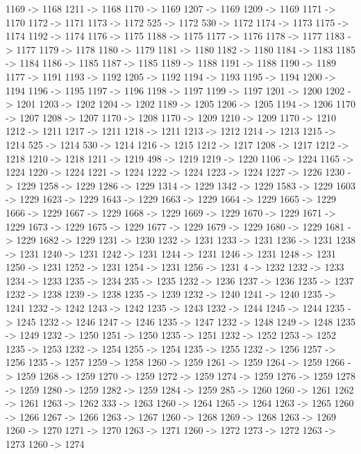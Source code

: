 {	1169 -> 1168
	1211 -> 1168
	1170 -> 1169
	1207 -> 1169
	1209 -> 1169
	1171 -> 1170
	1172 -> 1171
	1173 -> 1172
	525 -> 1172
	530 -> 1172
	1174 -> 1173
	1175 -> 1174
	1192 -> 1174
	1176 -> 1175
	1188 -> 1175
	1177 -> 1176
	1178 -> 1177
	1183 -> 1177
	1179 -> 1178
	1180 -> 1179
	1181 -> 1180
	1182 -> 1180
	1184 -> 1183
	1185 -> 1184
	1186 -> 1185
	1187 -> 1185
	1189 -> 1188
	1191 -> 1188
	1190 -> 1189
	1177 -> 1191
	1193 -> 1192
	1205 -> 1192
	1194 -> 1193
	1195 -> 1194
	1200 -> 1194
	1196 -> 1195
	1197 -> 1196
	1198 -> 1197
	1199 -> 1197
	1201 -> 1200
	1202 -> 1201
	1203 -> 1202
	1204 -> 1202
	1189 -> 1205
	1206 -> 1205
	1194 -> 1206
	1170 -> 1207
	1208 -> 1207
	1170 -> 1208
	1170 -> 1209
	1210 -> 1209
	1170 -> 1210
	1212 -> 1211
	1217 -> 1211
	1218 -> 1211
	1213 -> 1212
	1214 -> 1213
	1215 -> 1214
	525 -> 1214
	530 -> 1214
	1216 -> 1215
	1212 -> 1217
	1208 -> 1217
	1212 -> 1218
	1210 -> 1218
	1211 -> 1219
	498 -> 1219
	1219 -> 1220
	1106 -> 1224
	1165 -> 1224
	1220 -> 1224
	1221 -> 1224
	1222 -> 1224
	1223 -> 1224
	1227 -> 1226
	1230 -> 1229
	1258 -> 1229
	1286 -> 1229
	1314 -> 1229
	1342 -> 1229
	1583 -> 1229
	1603 -> 1229
	1623 -> 1229
	1643 -> 1229
	1663 -> 1229
	1664 -> 1229
	1665 -> 1229
	1666 -> 1229
	1667 -> 1229
	1668 -> 1229
	1669 -> 1229
	1670 -> 1229
	1671 -> 1229
	1673 -> 1229
	1675 -> 1229
	1677 -> 1229
	1679 -> 1229
	1680 -> 1229
	1681 -> 1229
	1682 -> 1229
	1231 -> 1230
	1232 -> 1231
	1233 -> 1231
	1236 -> 1231
	1238 -> 1231
	1240 -> 1231
	1242 -> 1231
	1244 -> 1231
	1246 -> 1231
	1248 -> 1231
	1250 -> 1231
	1252 -> 1231
	1254 -> 1231
	1256 -> 1231
	4 -> 1232
	1232 -> 1233
	1234 -> 1233
	1235 -> 1234
	235 -> 1235
	1232 -> 1236
	1237 -> 1236
	1235 -> 1237
	1232 -> 1238
	1239 -> 1238
	1235 -> 1239
	1232 -> 1240
	1241 -> 1240
	1235 -> 1241
	1232 -> 1242
	1243 -> 1242
	1235 -> 1243
	1232 -> 1244
	1245 -> 1244
	1235 -> 1245
	1232 -> 1246
	1247 -> 1246
	1235 -> 1247
	1232 -> 1248
	1249 -> 1248
	1235 -> 1249
	1232 -> 1250
	1251 -> 1250
	1235 -> 1251
	1232 -> 1252
	1253 -> 1252
	1235 -> 1253
	1232 -> 1254
	1255 -> 1254
	1235 -> 1255
	1232 -> 1256
	1257 -> 1256
	1235 -> 1257
	1259 -> 1258
	1260 -> 1259
	1261 -> 1259
	1264 -> 1259
	1266 -> 1259
	1268 -> 1259
	1270 -> 1259
	1272 -> 1259
	1274 -> 1259
	1276 -> 1259
	1278 -> 1259
	1280 -> 1259
	1282 -> 1259
	1284 -> 1259
	285 -> 1260
	1260 -> 1261
	1262 -> 1261
	1263 -> 1262
	333 -> 1263
	1260 -> 1264
	1265 -> 1264
	1263 -> 1265
	1260 -> 1266
	1267 -> 1266
	1263 -> 1267
	1260 -> 1268
	1269 -> 1268
	1263 -> 1269
	1260 -> 1270
	1271 -> 1270
	1263 -> 1271
	1260 -> 1272
	1273 -> 1272
	1263 -> 1273
	1260 -> 1274
}
